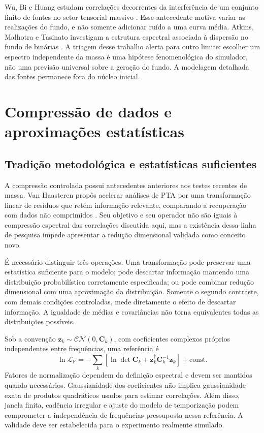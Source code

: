 Wu, Bi e Huang estudam correlações decorrentes da interferência de um
conjunto finito de fontes no setor tensorial massivo
\autocite{wu2025}. Esse antecedente motiva variar as realizações do
fundo, e não somente adicionar ruído a uma curva média. Atkins, Malhotra
e Tasinato investigam a estrutura espectral associada à dispersão no
fundo de binárias \autocite{atkins2024}. A triagem desse trabalho alerta
para outro limite: escolher um espectro independente da massa é uma
hipótese fenomenológica do simulador, não uma previsão universal sobre
a geração do fundo. A modelagem detalhada das fontes permanece fora do
núcleo inicial.

\section{Compressão de dados e aproximações estatísticas}

\subsection{Tradição metodológica e estatísticas suficientes}

A compressão controlada possui antecedentes anteriores aos testes
recentes de massa. Van Haasteren propôs acelerar análises de PTA por
uma transformação linear de resíduos que retém informação relevante,
comparando a recuperação com dados não comprimidos
\autocite{vanhaasteren2013}. Seu objetivo e seu operador não são iguais
à compressão espectral das correlações discutida aqui, mas a existência
dessa linha de pesquisa impede apresentar a redução dimensional
validada como conceito novo.

É necessário distinguir três operações. Uma transformação pode
preservar uma estatística suficiente para o modelo; pode descartar
informação mantendo uma distribuição probabilística corretamente
especificada; ou pode combinar redução dimensional com uma aproximação
da distribuição. Somente o segundo contraste, com demais condições
controladas, mede diretamente o efeito de descartar informação. A
igualdade de médias e covariâncias não torna equivalentes todas as
distribuições possíveis.

Sob a convenção \(\mathbf z_k\sim\mathcal{CN}(0,\mathbf C_k)\), com
coeficientes complexos próprios independentes entre frequências, uma
referência é
\begin{equation}
 \ln\mathcal L_{\mathrm F}
 =-\sum_k\left[\ln\det\mathbf C_k
       +\mathbf z_k^\dagger\mathbf C_k^{-1}\mathbf z_k\right]
       +\mathrm{const.}
 \label{eq:rev-fourier}
\end{equation}
Fatores de normalização dependem da definição espectral e devem ser
mantidos quando necessários. Gaussianidade dos coeficientes não implica
gaussianidade exata de produtos quadráticos usados para estimar
correlações. Além disso, janela finita, cadência irregular e ajuste do
modelo de temporização podem comprometer a independência de
frequências pressuposta nessa referência. A validade deve ser
estabelecida para o experimento realmente simulado.

